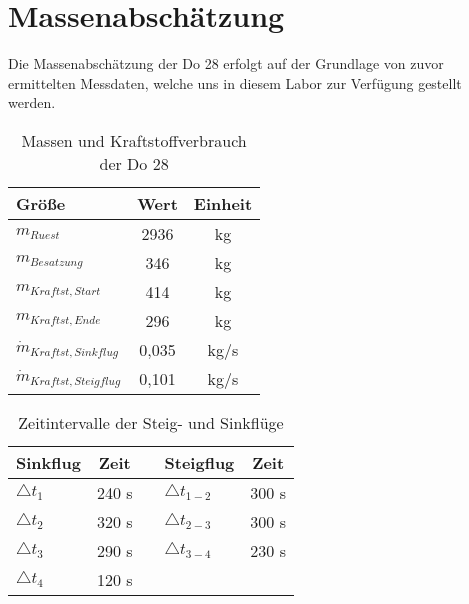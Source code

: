\chapter{Massenabschätzung}
\label{chapter:masse}
Die Massenabschätzung der Do 28 erfolgt auf der Grundlage von zuvor ermittelten Messdaten, welche uns in diesem Labor zur Verfügung gestellt werden. \\

\begin{table}[h]
	\centering
	\begin{tabular}{|l|c|c|}
		\hline
	\textbf{Größe}		 & \textbf{Wert}& \textbf{Einheit} \\ \hline
	$m_{Ruest}$  		 & 2936			& {kg}        \\ \hline
	$m_{Besatzung}$ 	 & 346			& {kg}		  \\ \hline
	$m_{Kraftst,Start}$	 & 414			& {kg}		  \\ \hline
	$m_{Kraftst,Ende}$	 & 296			& {kg}		  \\ \hline
	$\dot{m}_{Kraftst,Sinkflug}$    & 0,035			& {kg/s}		  \\ \hline
	$\dot{m}_{Kraftst,Steigflug}$ 	 & 0,101			& {kg/s}	  \\ \hline
		


\end{tabular}
	\caption{Massen und Kraftstoffverbrauch der Do 28}
\end{table}


\begin{table}[h]
	\centering
	\begin{tabular}{|l|c|c|l|c|}
		\hline
		\textbf{Sinkflug}		 & \textbf{Zeit}& \textbf{} & \textbf{Steigflug} & \textbf{Zeit} \\ \hline
		$\triangle t_1$  & 240 {s} & & $\triangle t_{1-2}$ & 300 s         \\ \hline
		$\triangle t_2$  & 320 {s} & & $\triangle t_{2-3}$ & 300 s		  \\ \hline
		$\triangle t_3$	 & 290 {s} & & $\triangle t_{3-4}$ & 230 s	  \\ \hline
		$\triangle t_4$	 & 120 {s} & &	&	  \\ \hline
	
	  \hline
		
		
		
	\end{tabular}
	\caption{Zeitintervalle der Steig- und Sinkflüge}
\end{table} 
\vspace{0.3cm} 

